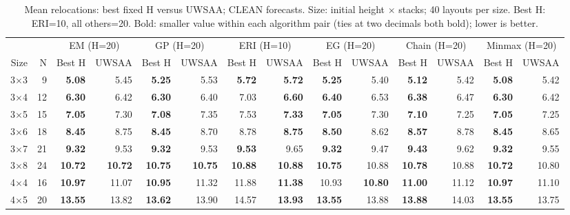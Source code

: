 \begin{table}[t]
\centering\scriptsize
\caption{Mean relocations: best fixed H versus UWSAA; CLEAN forecasts. Size: initial height $\times$ stacks; 40 layouts per size. Best H: ERI=10, all others=20. Bold: smaller value within each algorithm pair (ties at two decimals both bold); lower is better.}
\setlength{\tabcolsep}{4pt}
\begin{tabular}{rrrrrrrrrrrrrr}
\toprule
 &  & \multicolumn{2}{c}{EM (H=20)} & \multicolumn{2}{c}{GP (H=20)} & \multicolumn{2}{c}{ERI (H=10)} & \multicolumn{2}{c}{EG (H=20)} & \multicolumn{2}{c}{Chain (H=20)} & \multicolumn{2}{c}{Minmax (H=20)} \\
\cmidrule(lr){3-4} \cmidrule(lr){5-6} \cmidrule(lr){7-8} \cmidrule(lr){9-10} \cmidrule(lr){11-12} \cmidrule(lr){13-14}
Size & N & Best H & UWSAA & Best H & UWSAA & Best H & UWSAA & Best H & UWSAA & Best H & UWSAA & Best H & UWSAA \\
\midrule
3$\times$3 & 9 & \textbf{5.08} & 5.45 & \textbf{5.25} & 5.53 & \textbf{5.72} & \textbf{5.72} & \textbf{5.25} & 5.40 & \textbf{5.12} & 5.42 & \textbf{5.08} & 5.42 \\
3$\times$4 & 12 & \textbf{6.30} & 6.42 & \textbf{6.30} & 6.40 & 7.03 & \textbf{6.60} & \textbf{6.40} & 6.53 & \textbf{6.38} & 6.47 & \textbf{6.30} & 6.42 \\
3$\times$5 & 15 & \textbf{7.05} & 7.30 & \textbf{7.08} & 7.35 & 7.53 & \textbf{7.33} & \textbf{7.05} & 7.30 & \textbf{7.10} & 7.25 & \textbf{7.05} & 7.25 \\
3$\times$6 & 18 & \textbf{8.45} & 8.75 & \textbf{8.45} & 8.70 & 8.78 & \textbf{8.75} & \textbf{8.50} & 8.62 & \textbf{8.57} & 8.78 & \textbf{8.45} & 8.65 \\
3$\times$7 & 21 & \textbf{9.32} & 9.53 & \textbf{9.32} & 9.53 & \textbf{9.53} & 9.65 & \textbf{9.32} & 9.47 & \textbf{9.43} & 9.62 & \textbf{9.32} & 9.55 \\
3$\times$8 & 24 & \textbf{10.72} & \textbf{10.72} & \textbf{10.75} & \textbf{10.75} & \textbf{10.88} & \textbf{10.88} & \textbf{10.75} & 10.88 & \textbf{10.78} & 10.88 & \textbf{10.72} & 10.80 \\
4$\times$4 & 16 & \textbf{10.97} & 11.07 & \textbf{10.95} & 11.32 & 11.88 & \textbf{11.38} & 10.93 & \textbf{10.80} & \textbf{11.00} & 11.12 & \textbf{10.97} & 11.10 \\
4$\times$5 & 20 & \textbf{13.55} & 13.82 & \textbf{13.62} & 13.90 & 14.57 & \textbf{13.93} & \textbf{13.55} & 13.88 & \textbf{13.88} & 14.03 & \textbf{13.55} & 13.75 \\

\end{tabular}
\end{table}
